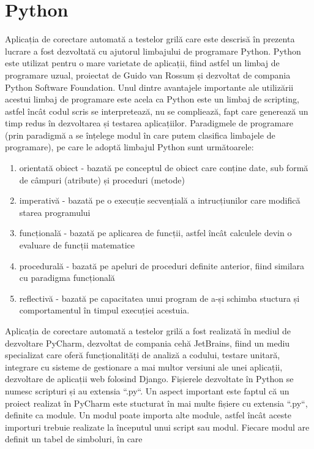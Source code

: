\documentclass[a4paper,12pt]{report}
\newcommand\tab[1][1cm]{\hspace*{#1}}
\begin{document}
\chapter{ Python}
\tab Aplicația de corectare automată a testelor grilă care este descrisă în prezenta lucrare a fost dezvoltată cu ajutorul limbajului de programare
Python. Python este utilizat pentru o mare varietate de aplicații, fiind astfel un limbaj de programare uzual, proiectat de Guido van
Rossum și dezvoltat de compania Python Software Foundation. Unul dintre avantajele importante ale utilizării acestui limbaj de programare este
acela ca Python este un limbaj de scripting, astfel încât codul scris se interpretează, nu se compliează, fapt care generează un timp redus în 
dezvoltarea și testarea aplicațiilor. Paradigmele de programare (prin paradigmă a se înțelege modul în care putem clasifica limbajele de programare),
pe care le adoptă limbajul Python sunt următoarele:
	\begin{enumerate}
	\setlength\itemsep{1pt}
	\item orientată obiect -  bazată pe conceptul de obiect care conține date, sub formă de câmpuri (atribute) și proceduri (metode)
	\item imperativă - bazată pe o execuție secvențială a intrucțiunilor care modifică starea programului
	\item funcțională - bazată pe aplicarea de funcții, astfel încât calculele devin o evaluare de funcții matematice
	\item procedurală - bazată pe apeluri de proceduri definite anterior, fiind similara cu paradigma funcțională
	\item reflectivă - bazată pe capacitatea unui program de a-și schimba stuctura și comportamentul în timpul execuției acestuia.
	\end{enumerate}
\tab Aplicația de corectare automată a testelor grilă a fost realizată în mediul de dezvoltare PyCharm, dezvoltat de compania cehă JetBrains, fiind 
un mediu specializat care oferă funcționalități de analiză a codului, testare unitară, integrare cu sisteme de gestionare a mai multor versiuni ale unei
aplicații, dezvoltare de aplicații web folosind Django. Fișierele dezvoltate în Python se numesc scripturi și au extensia ``.py``. Un aspect important
este faptul că un proiect realizat în PyCharm este stucturat în mai multe fișiere cu extensia ``.py``, definite ca module. Un modul poate importa
alte module, astfel încât aceste importuri trebuie realizate la începutul unui script sau modul. Fiecare modul are definit un tabel de simboluri, în care
\end{document}
